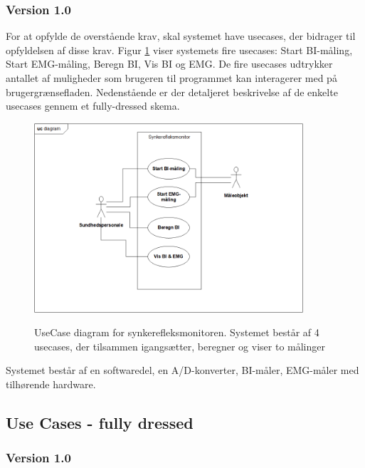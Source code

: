 \subsubsection{Version 1.0} 

For at opfylde de overstående krav, skal systemet have usecases, der bidrager til opfyldelsen af disse krav.
Figur \ref{UseCaseV1} viser systemets fire  usecases: Start BI-måling, Start EMG-måling, Beregn BI, Vis BI og EMG. De fire usecases udtrykker antallet af muligheder som brugeren til programmet kan interagerer med på brugergrænsefladen.  Nedenstående er der detaljeret beskrivelse af de enkelte usecases gennem et fully-dressed skema. 


\begin{figure}[H]
\centering
{\includegraphics[width=10cm]
{Figure/usecaseDiaV1}}
\caption{UseCase diagram for synkerefleksmonitoren. Systemet består af 4 usecases, der tilsammen igangsætter, beregner og viser to målinger}
\label{UseCaseV1}
\end{figure}







Systemet består af en softwaredel, en A/D-konverter, BI-måler, EMG-måler med tilhørende hardware.






\subsection{Use Cases - fully dressed}

\subsubsection{Version 1.0}

